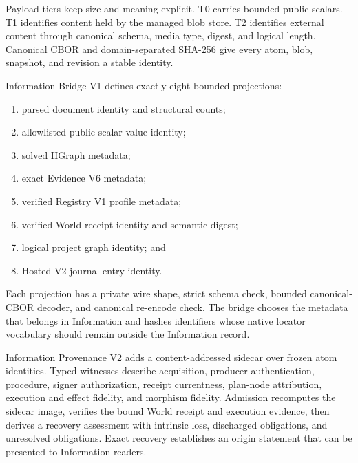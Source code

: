 \documentclass[11pt,oneside]{article}
\begin{document}
Payload tiers keep size and meaning explicit. T0 carries bounded public
scalars. T1 identifies content held by the managed blob store. T2 identifies
external content through canonical schema, media type, digest, and logical
length. Canonical CBOR and domain-separated SHA-256 give every atom, blob,
snapshot, and revision a stable identity.

Information Bridge V1 defines exactly eight bounded projections:

\begin{enumerate}
  \item parsed document identity and structural counts;
  \item allowlisted public scalar value identity;
  \item solved HGraph metadata;
  \item exact Evidence V6 metadata;
  \item verified Registry V1 profile metadata;
  \item verified World receipt identity and semantic digest;
  \item logical project graph identity; and
  \item Hosted V2 journal-entry identity.
\end{enumerate}

Each projection has a private wire shape, strict schema check, bounded
canonical-CBOR decoder, and canonical re-encode check. The bridge chooses the
metadata that belongs in Information and hashes identifiers whose native
locator vocabulary should remain outside the Information record.

Information Provenance V2 adds a content-addressed sidecar over frozen atom
identities. Typed witnesses describe acquisition, producer authentication,
procedure, signer authorization, receipt currentness, plan-node attribution,
execution and effect fidelity, and morphism fidelity. Admission recomputes the
sidecar image, verifies the bound World receipt and execution evidence, then
derives a recovery assessment with intrinsic loss, discharged obligations,
and unresolved obligations. Exact recovery establishes an origin statement
that can be presented to Information readers.
\end{document}
